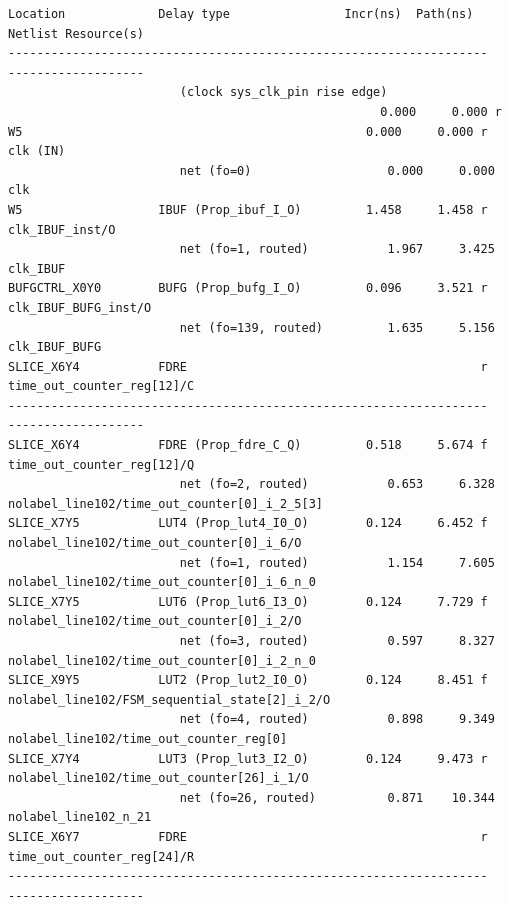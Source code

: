 \documentclass{report}
\newenvironment{narrowmargins}{
    \newgeometry{top=1in, bottom=1in, left=0.5in, right=0.5in}
}{\restoregeometry}
\begin{document}
\begin{narrowmargins}
\begin{verbatim}
Location             Delay type                Incr(ns)  Path(ns)    Netlist Resource(s)
-------------------------------------------------------------------    -------------------
                        (clock sys_clk_pin rise edge)
                                                    0.000     0.000 r  
W5                                                0.000     0.000 r  clk (IN)
                        net (fo=0)                   0.000     0.000    clk
W5                   IBUF (Prop_ibuf_I_O)         1.458     1.458 r  clk_IBUF_inst/O
                        net (fo=1, routed)           1.967     3.425    clk_IBUF
BUFGCTRL_X0Y0        BUFG (Prop_bufg_I_O)         0.096     3.521 r  clk_IBUF_BUFG_inst/O
                        net (fo=139, routed)         1.635     5.156    clk_IBUF_BUFG
SLICE_X6Y4           FDRE                                         r  time_out_counter_reg[12]/C
-------------------------------------------------------------------    -------------------
SLICE_X6Y4           FDRE (Prop_fdre_C_Q)         0.518     5.674 f  time_out_counter_reg[12]/Q
                        net (fo=2, routed)           0.653     6.328    nolabel_line102/time_out_counter[0]_i_2_5[3]
SLICE_X7Y5           LUT4 (Prop_lut4_I0_O)        0.124     6.452 f  nolabel_line102/time_out_counter[0]_i_6/O
                        net (fo=1, routed)           1.154     7.605    nolabel_line102/time_out_counter[0]_i_6_n_0
SLICE_X7Y5           LUT6 (Prop_lut6_I3_O)        0.124     7.729 f  nolabel_line102/time_out_counter[0]_i_2/O
                        net (fo=3, routed)           0.597     8.327    nolabel_line102/time_out_counter[0]_i_2_n_0
SLICE_X9Y5           LUT2 (Prop_lut2_I0_O)        0.124     8.451 f  nolabel_line102/FSM_sequential_state[2]_i_2/O
                        net (fo=4, routed)           0.898     9.349    nolabel_line102/time_out_counter_reg[0]
SLICE_X7Y4           LUT3 (Prop_lut3_I2_O)        0.124     9.473 r  nolabel_line102/time_out_counter[26]_i_1/O
                        net (fo=26, routed)          0.871    10.344    nolabel_line102_n_21
SLICE_X6Y7           FDRE                                         r  time_out_counter_reg[24]/R
-------------------------------------------------------------------    -------------------


\end{verbatim}
\end{narrowmargins}
\end{document}
